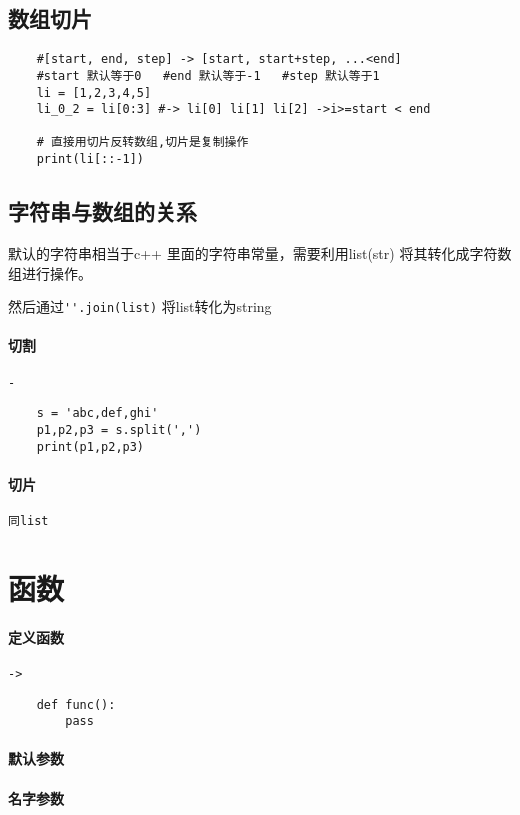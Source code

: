 \documentclass[UTF8,a4paper,12pt]{ctexbook}
\begin{document}
		\subsection{数组切片}
			\begin{lstlisting}
	#[start, end, step] -> [start, start+step, ...<end]
	#start 默认等于0   #end 默认等于-1   #step 默认等于1
	li = [1,2,3,4,5]
	li_0_2 = li[0:3] #-> li[0] li[1] li[2] ->i>=start < end
	
	# 直接用切片反转数组,切片是复制操作
	print(li[::-1])
			\end{lstlisting}
			
		\subsection{字符串与数组的关系}
			默认的字符串相当于c++ 里面的字符串常量，需要利用list(str) 将其转化成字符数组进行操作。
			
			然后通过\verb|''.join(list)| 将list转化为string 
			
			\paragraph{切割}\verb|-|
				\begin{lstlisting}
	s = 'abc,def,ghi'
	p1,p2,p3 = s.split(',')
	print(p1,p2,p3)
				\end{lstlisting}
				
			\paragraph{切片}\verb|同list|
	\section{函数}
		\paragraph{定义函数}\verb|->|
			\begin{lstlisting}
	def func():
		pass
			\end{lstlisting}
			
		\paragraph{默认参数}
		
		\paragraph{名字参数}
		
\end{document}
